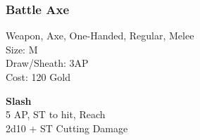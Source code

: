 \subsubsection{Battle Axe}\label{weapon:battleaxe}
Weapon, Axe, One-Handed, Regular, Melee\\
Size: M\\
Draw/Sheath: 3AP\\
Cost: 120 Gold

\textbf{Slash}\\
5 AP, ST to hit,  Reach\\
2d10 + \texttimes ST Cutting Damage
